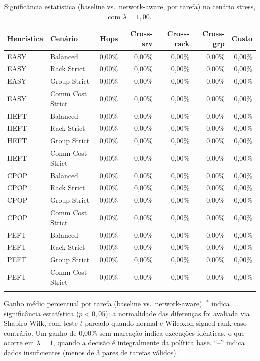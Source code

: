 \begin{table}[htbp]
\centering
\small
\caption{Significância estatística (baseline vs.\ network-aware, por tarefa) no cenário stress, com $\lambda = 1{,}00$.}
\label{tab:significancia_stress_lambda_100}
\begin{tabular}{llrrrrr}
\toprule
Heurística & Cenário & Hops & Cross-srv & Cross-rack & Cross-grp & Custo \\
\midrule
EASY & Balanced & 0,00\% & 0,00\% & 0,00\% & 0,00\% & 0,00\% \\
EASY & Rack Strict & 0,00\% & 0,00\% & 0,00\% & 0,00\% & 0,00\% \\
EASY & Group Strict & 0,00\% & 0,00\% & 0,00\% & 0,00\% & 0,00\% \\
EASY & Comm Cost Strict & 0,00\% & 0,00\% & 0,00\% & 0,00\% & 0,00\% \\
\addlinespace
HEFT & Balanced & 0,00\% & 0,00\% & 0,00\% & 0,00\% & 0,00\% \\
HEFT & Rack Strict & 0,00\% & 0,00\% & 0,00\% & 0,00\% & 0,00\% \\
HEFT & Group Strict & 0,00\% & 0,00\% & 0,00\% & 0,00\% & 0,00\% \\
HEFT & Comm Cost Strict & 0,00\% & 0,00\% & 0,00\% & 0,00\% & 0,00\% \\
\addlinespace
CPOP & Balanced & 0,00\% & 0,00\% & 0,00\% & 0,00\% & 0,00\% \\
CPOP & Rack Strict & 0,00\% & 0,00\% & 0,00\% & 0,00\% & 0,00\% \\
CPOP & Group Strict & 0,00\% & 0,00\% & 0,00\% & 0,00\% & 0,00\% \\
CPOP & Comm Cost Strict & 0,00\% & 0,00\% & 0,00\% & 0,00\% & 0,00\% \\
\addlinespace
PEFT & Balanced & 0,00\% & 0,00\% & 0,00\% & 0,00\% & 0,00\% \\
PEFT & Rack Strict & 0,00\% & 0,00\% & 0,00\% & 0,00\% & 0,00\% \\
PEFT & Group Strict & 0,00\% & 0,00\% & 0,00\% & 0,00\% & 0,00\% \\
PEFT & Comm Cost Strict & 0,00\% & 0,00\% & 0,00\% & 0,00\% & 0,00\% \\
\addlinespace
\bottomrule
\end{tabular}

\vspace{2mm}
\footnotesize Ganho médio percentual por tarefa (baseline vs.\ network-aware). $^{*}$ indica significância estatística ($p<0{,}05$): a normalidade das diferenças foi avaliada via Shapiro-Wilk, com teste $t$ pareado quando normal e Wilcoxon signed-rank caso contrário. Um ganho de 0,00\% sem marcação indica execuções idênticas, o que ocorre em $\lambda = 1$, quando a decisão é integralmente da política base. ``--'' indica dados insuficientes (menos de 3 pares de tarefas válidos).
\end{table}
